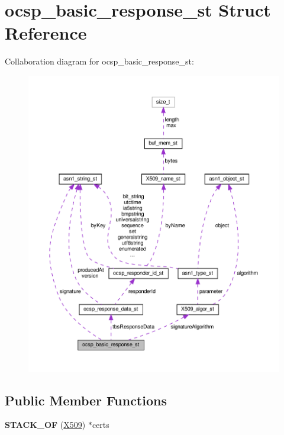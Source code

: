 \hypertarget{structocsp__basic__response__st}{}\section{ocsp\+\_\+basic\+\_\+response\+\_\+st Struct Reference}
\label{structocsp__basic__response__st}


Collaboration diagram for ocsp\+\_\+basic\+\_\+response\+\_\+st\+:
\nopagebreak
\begin{figure}[H]
\begin{center}
\leavevmode
\includegraphics[width=350pt]{structocsp__basic__response__st__coll__graph}
\end{center}
\end{figure}
\subsection*{Public Member Functions}
\begin{DoxyCompactItemize}
\item 
\mbox{\label{structocsp__basic__response__st_aedc45c00d3c3a3b4a971235ff5ab3545}} 
{\bfseries S\+T\+A\+C\+K\+\_\+\+OF} (\hyperlink{structx509__st}{X509}) $\ast$certs
\end{DoxyCompactItemize}

